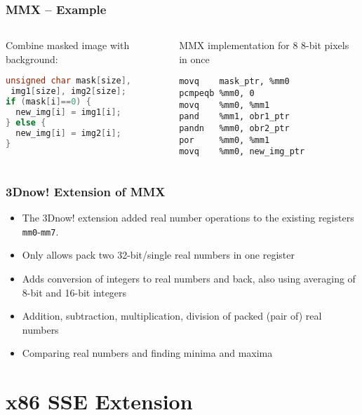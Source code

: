 \documentclass{beamer}
\begin{document}
\begin{frame}[fragile]
\frametitle{MMX -- Example}

\begin{columns}[t,onlytextwidth]
  \begin{column}{0.5\textwidth}
Combine masked image with background:
\begin{lstlisting}[language={C},columns=flexible]
unsigned char mask[size],
 img1[size], img2[size];
if (mask[i]==0) {
  new_img[i] = img1[i];
} else {
  new_img[i] = img2[i];
}
\end{lstlisting}

  \end{column}
  \begin{column}{0.5\textwidth}
MMX implementation for 8 8-bit pixels in once
\begin{lstlisting}[language={[x86masm]Assembler},columns=flexible]
movq    mask_ptr, %mm0
pcmpeqb %mm0, 0
movq    %mm0, %mm1
pand    %mm1, obr1_ptr
pandn   %mm0, obr2_ptr
por     %mm0, %mm1
movq    %mm0, new_img_ptr
\end{lstlisting}
  \end{column}
\end{columns}
\end{frame}




\begin{frame}
\frametitle{3Dnow! Extension of MMX}
\begin{itemize}
\item The 3Dnow! extension added real number operations to the existing registers \texttt{mm0}-\texttt{mm7}.
\item Only allows pack two 32-bit/single real numbers in one register
\item Adds conversion of integers to real numbers and back, also using averaging of 8-bit and 16-bit integers
\item Addition, subtraction, multiplication, division of packed (pair of) real numbers
\item Comparing real numbers and finding minima and maxima

\end{itemize}
\end{frame}

\section{x86 SSE Extension}
\end{document}
